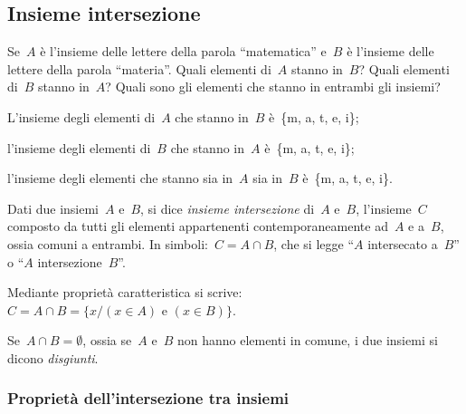 
\subsection{Insieme intersezione}
\label{subsec:op_intersezione}

\begin{exrig}
\vspace{1.05ex}
 \begin{esempio}
Se~\(A\) è l'insieme delle lettere della parola ``matematica'' e~\(B\) è 
l'insieme delle lettere della parola ``materia''. 
Quali elementi di~\(A\) stanno in~\(B\)? Quali elementi di~\(B\) stanno 
in~\(A\)? 
Quali sono gli elementi che stanno in entrambi gli insiemi?

\begin{itemize*}
 \item L'insieme degli elementi di~\(A\) che stanno in~\(B\) 
 è~\{m, a, t, e, i\};
 \item l'insieme degli elementi di~\(B\) che stanno in~\(A\) 
 è~\{m, a, t, e, i\};
 \item l'insieme degli elementi che stanno sia in~\(A\) sia in~\(B\) 
 è~\{m, a, t, e, i\}.
\end{itemize*}
\end{esempio}
\end{exrig}

\begin{definizione}
Dati due insiemi~\(A\) e~\(B\), si dice \emph{insieme intersezione} 
di~\(A\) e~\(B\), 
l'insieme~\(C\) composto da tutti gli elementi appartenenti 
contemporaneamente 
ad~\(A\) e a~\(B\), ossia comuni a entrambi.
In simboli:~\(C=A\cap B\), che si legge ``\(A\) intersecato a~\(B\)'' 
o ``\(A\) intersezione~\(B\)''.
\end{definizione}
\begin{center}
 
\end{center}
Mediante proprietà caratteristica si 
scrive:~\(C=A\cap B=\{x/(x\in A)\text{ e }(x\in B)\}\).

Se~\(A\cap B=\emptyset \), ossia se~\(A\) e~\(B\) non hanno
elementi in comune, i due insiemi si dicono \emph{disgiunti}.

\subsubsection{Proprietà dell'intersezione tra insiemi}

